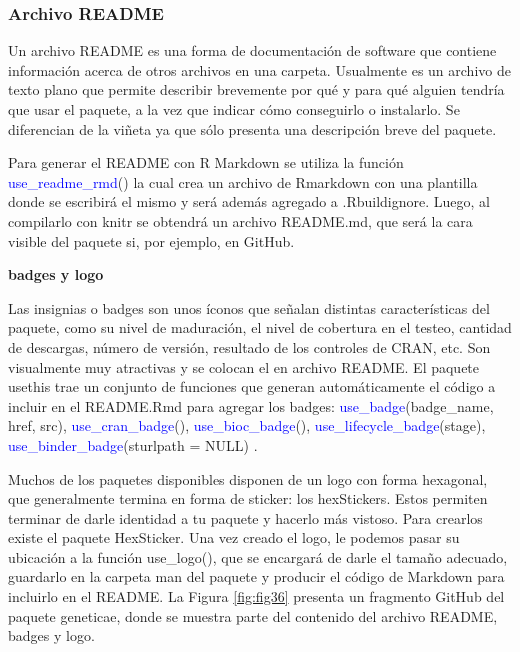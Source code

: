 \subsubsection{Archivo README}

Un archivo README es una forma de documentación de software que contiene información acerca de otros archivos en una carpeta. Usualmente es un archivo de texto plano que permite describir brevemente por qué y para qué alguien tendría que usar el paquete, a la vez que indicar cómo conseguirlo o instalarlo. Se diferencian de la viñeta ya que sólo presenta una descripción breve del paquete.


Para generar el README con R Markdown se utiliza la función \textcolor{blue}{use\_readme\_rmd}() la cual crea un archivo de Rmarkdown con una plantilla donde se escribirá el mismo y será además agregado a .Rbuildignore. Luego, al compilarlo con knitr se obtendrá un archivo README.md, que será la cara visible del paquete si, por ejemplo, en GitHub.

\textbf{badges y logo}

Las insignias o badges son unos íconos que señalan distintas características del paquete, como su nivel de maduración, el nivel de cobertura en el testeo, cantidad de descargas, número de versión, resultado de los controles de CRAN, etc.
Son visualmente muy atractivas y se colocan el en archivo README.     El paquete usethis trae un conjunto de funciones que generan automáticamente el código a incluir en el README.Rmd para agregar los badges: \textcolor{blue}{use\_badge}(badge\_name, href, src), \textcolor{blue}{use\_cran\_badge}(), \textcolor{blue}{use\_bioc\_badge}(), \textcolor{blue}{use\_lifecycle\_badge}(stage), 
\textcolor{blue}{use\_binder\_badge}(sturlpath = NULL) .


Muchos de los paquetes disponibles disponen de un logo con forma hexagonal, que generalmente termina en forma de sticker: los hexStickers. Estos permiten terminar de darle identidad a tu paquete y hacerlo más vistoso. Para crearlos existe el paquete HexSticker. Una vez creado el logo, le podemos pasar su ubicación a la función use\_logo(), que se encargará de darle el tamaño adecuado, guardarlo en la carpeta man del paquete y producir el código de Markdown para incluirlo en el README. 
La Figura \ref{fig:fig36} presenta un fragmento GitHub del paquete geneticae, donde se muestra parte del contenido del archivo README, badges y logo.

